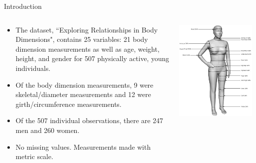 \documentclass[table]{beamer}\usepackage[]{graphicx}\usepackage[]{color}
\begin{document}
\begin{frame}{Introduction}



\begin{columns}[t] %
\begin{column}[T]{6cm} %
{\fontsize{0.3cm}{1em}\selectfont
\begin{itemize}
  \item The dataset, ``Exploring Relationships in Body Dimensions", contains 25 variables: 21 body dimension measurements as well as age, weight, height, and gender for 507 physically active, young individuals.
  \item Of the body dimension measurements, 9 were skeletal/diameter measurements and 12 were girth/circumference measurements.
  \item Of the 507 individual observations, there are 247 men and 260 women.
  \item No missing values. Measurements made with metric scale.
\end{itemize}
}
\end{column}

\begin{column}[T]{6cm} 
\includegraphics[width=\textwidth]{body}
\end{column}
\end{columns}

\end{frame}
\end{document}
